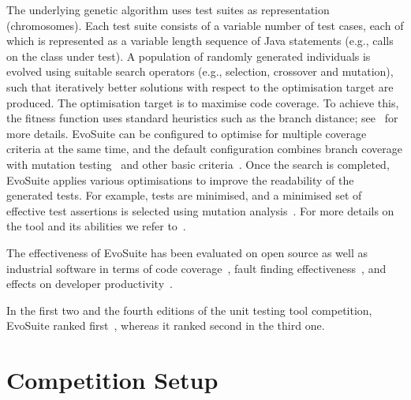\documentclass[10pt,conference]{IEEEtran}
\newcommand{\EVOSUITE}{{\sc EvoSuite}\xspace}
\begin{document}
The underlying genetic algorithm uses test suites as representation
(chromosomes). Each test suite consists of a variable number of test
cases, each of which is represented as a variable length sequence of
Java statements (e.g., calls on the class under test). A population of
randomly generated individuals is evolved using suitable search
operators (e.g., selection, crossover and mutation), such that
iteratively better solutions with respect to the optimisation target
are produced. The optimisation target is to maximise code coverage. To
achieve this, the fitness function uses standard heuristics such as
the branch distance; see~\cite{GoA_TSE12} for more details. \EVOSUITE
can be configured to optimise for multiple coverage criteria at the
same time, and the default configuration combines branch coverage with
mutation testing~\cite{emse14_mutation} and other basic
criteria~\cite{rojas2015combining}. Once the search is completed,
\EVOSUITE applies various optimisations to improve the readability of
the generated tests. For example, tests are minimised, and a
minimised set of effective test assertions is selected using mutation
analysis~\cite{10.1109/TSE.2011.93}. For more details on the tool and
its abilities we refer to~\cite{FrA11c,FrA13a}.


The effectiveness of \EVOSUITE has been evaluated on open source as
well as industrial software in terms of code
coverage~\cite{fraser2014large,emse_archive}, fault finding
effectiveness~\cite{shamshiri2015automatically,moein2017}, and effects
on developer productivity~\cite{TOSEM_userstudy,ISSTA15_Study}.

In the first two and the fourth editions of the unit testing tool
competition, \EVOSUITE ranked
first~\cite{evosuiteAtSbst2013,evosuiteAtFittest2013,evosuiteAtSbst2016},
whereas it ranked second in the third one.








\section{Competition Setup}
\end{document}
